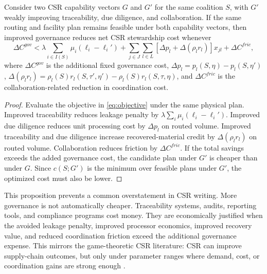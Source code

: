 \begin{proposition}
\label{prop:ch4_governance_value}
Consider two CSR capability vectors $G$ and $G'$ for the same coalition $S$, with $G'$ weakly improving traceability, due diligence, and collaboration. If the same routing and facility plan remains feasible under both capability vectors, then improved governance reduces net CSR stewardship cost whenever
\begin{equation}
\label{eq:ch4_governance_value_condition}
\Delta C^{gov}
<
\lambda\sum_{i\in I(S)}\mu_i(\ell_i-\ell_i')
+\sum_{j\in J}\sum_{l\in L}
\left[
\Delta p_l+\Delta\left(\rho_l r_l\right)
\right]x_{jl}
+\Delta C^{fric},
\end{equation}
where $\Delta C^{gov}$ is the additional fixed governance cost, $\Delta p_l=p_l(S,\eta)-p_l(S,\eta')$, $\Delta(\rho_l r_l)=\rho_l(S)r_l(S,\tau',\eta')-\rho_l(S)r_l(S,\tau,\eta)$, and $\Delta C^{fric}$ is the collaboration-related reduction in coordination cost.
\end{proposition}

\begin{proof}
Evaluate the objective in \eqref{eq:objective} under the same physical plan. Improved traceability reduces leakage penalty by $\lambda\sum_i\mu_i(\ell_i-\ell_i')$. Improved due diligence reduces unit processing cost by $\Delta p_l$ on routed volume. Improved traceability and due diligence increase recovered-material credit by $\Delta(\rho_l r_l)$ on routed volume. Collaboration reduces friction by $\Delta C^{fric}$. If the total savings exceeds the added governance cost, the candidate plan under $G'$ is cheaper than under $G$. Since $c(S;G')$ is the minimum over feasible plans under $G'$, the optimized cost must also be lower.
\end{proof}

This proposition prevents a common overstatement in CSR writing. More governance is not automatically cheaper. Traceability systems, audits, reporting tools, and compliance programs cost money. They are economically justified when the avoided leakage penalty, improved processor economics, improved recovery value, and reduced coordination friction exceed the additional governance expense. This mirrors the game-theoretic CSR literature: CSR can improve supply-chain outcomes, but only under parameter ranges where demand, cost, or coordination gains are strong enough \cite{FantiBuccella2017,Ferrara2017,Khosroshahi2019,ZhangLiang2023}.

